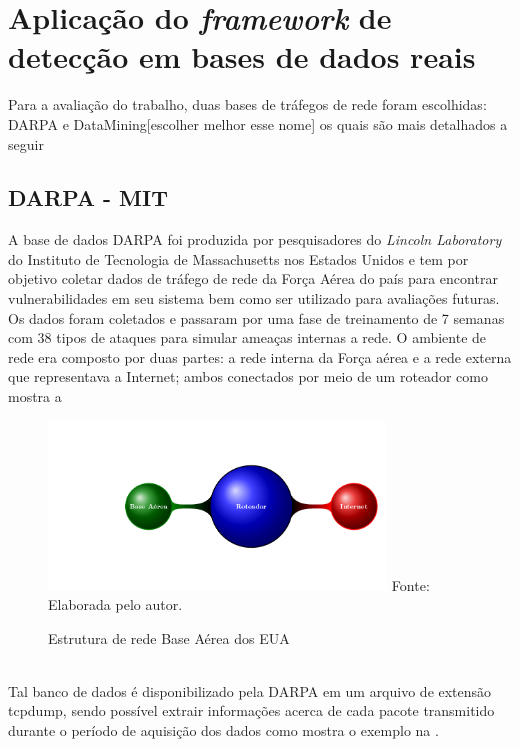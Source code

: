 \section{Aplicação do \textit{framework} de detecção em bases de dados reais}
\label{Sec:NaHiD_VERC}
Para a avaliação do trabalho, duas bases de tráfegos de rede foram escolhidas: DARPA e  DataMining[escolher melhor esse nome] os quais são mais detalhados a seguir 
\subsection{DARPA - MIT}
 A base de dados DARPA foi produzida por pesquisadores do \textit{Lincoln Laboratory} do Instituto de Tecnologia de Massachusetts nos Estados Unidos e tem por objetivo coletar dados de tráfego de rede da Força Aérea do país para encontrar vulnerabilidades em seu sistema bem como ser utilizado para avaliações futuras. Os dados foram coletados e passaram por uma fase de treinamento de 7 semanas com 38 tipos de ataques para simular ameaças internas a rede. O ambiente de rede era composto por duas partes: a rede interna da Força aérea e a rede externa que representava a Internet; ambos conectados por meio de um roteador como mostra a 
 \begin{figure}[ht]
 	\centering
	\caption{Estrutura de rede Base Aérea dos EUA }
		\includegraphics[width=0.8\textwidth]{figs/darpaStructure.pdf}
	{Fonte: Elaborada pelo autor.}
	\label{fig:DARPA_Estrututra}
\end{figure}
\\
Tal banco de dados é disponibilizado pela DARPA em um arquivo de extensão tcpdump, sendo possível extrair informações acerca de cada pacote transmitido durante o período de aquisição dos dados como mostra o exemplo na .

